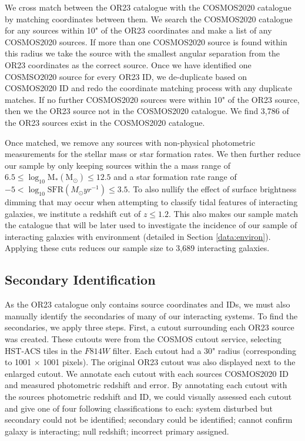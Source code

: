 \documentclass[fleqn,usenatbib]{mnras}
\begin{document}
We cross match between the OR23 catalogue with the COSMOS2020 catalogue by matching coordinates between them. We search the COSMOS2020 catalogue for any sources within 10" of the OR23 coordinates and make a list of any COSMOS2020 sources. If more than one COSMOS2020 source is found within this radius we take the source with the smallest angular separation from the OR23 coordinates as the correct source. Once we have identified one COSMSO2020 source for every OR23 ID, we de-duplicate based on COSMOS2020 ID and redo the coordinate matching process with any duplicate matches. If no further COSMOS2020 sources were within 10" of the OR23 source, then we the OR23 source not in the COSMOS2020 catalogue. We find 3,786 of the OR23 sources exist in the COSMOS2020 catalogue.

Once matched, we remove any sources with non-physical photometric measurements for the stellar mass or star formation rates. We then further reduce our sample by only keeping sources within the a mass range of $6.5 \leq \log_{10} \text{M}_{*}(\text{M}_{\odot}) \leq 12.5$ and a star formation rate range of $-5 < \log_{10} \text{SFR} (M_{\odot}yr^{-1}) \leq 3.5$. To also nullify the effect of surface brightness dimming that may occur when attempting to classify tidal features of interacting galaxies, we institute a redshift cut of $z \leq 1.2$. This also makes our sample match the catalogue that will be later used to investigate the incidence of our sample of interacting galaxies with environment (detailed in Section \ref{data:environ}). Applying these cuts reduces our sample size to 3,689 interacting galaxies.

\subsection{Secondary Identification}\label{sec:sec-ident}
\noindent As the OR23 catalogue only contains source coordinates and IDs, we must also manually identify the secondaries of many of our interacting systems. To find the secondaries, we apply three steps. First, a cutout surrounding each OR23 source was created. These cutouts were from the COSMOS cutout service, selecting HST-ACS tiles in the $F814W$ filter. Each cutout had a 30" radius (corresponding to 1001 $\times$ 1001 pixels). The original OR23 cutout was also displayed next to the enlarged cutout. We annotate each cutout with each sources COSMOS2020 ID and measured photometric redshift and error. By annotating each cutout with the sources photometric redshift and ID, we could visually assessed each cutout and give one of four following classifications to each: system disturbed but secondary could not be identified; secondary could be identified; cannot confirm galaxy is interacting; null redshift; incorrect primary assigned. 
\end{document}
